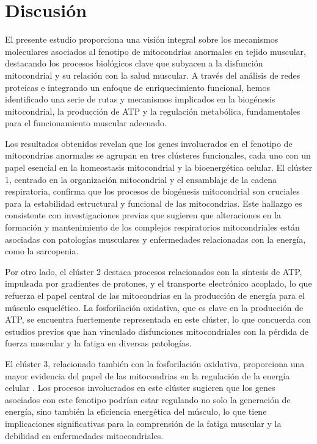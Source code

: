 \section{Discusión}

El presente estudio proporciona una visión integral sobre los mecanismos moleculares asociados al fenotipo de mitocondrias anormales en tejido muscular, destacando los procesos biológicos clave que subyacen a la disfunción mitocondrial y su relación con la salud muscular. A través del análisis de redes proteicas e integrando un enfoque de enriquecimiento funcional, hemos identificado una serie de rutas y mecanismos implicados en la biogénesis mitocondrial, la producción de ATP y la regulación metabólica, fundamentales para el funcionamiento muscular adecuado. \cite{Rebeca}

Los resultados obtenidos revelan que los genes involucrados en el fenotipo de mitocondrias anormales se agrupan en tres clústeres funcionales, cada uno con un papel esencial en la homeostasis mitocondrial y la bioenergética celular. El clúster 1, centrado en la organización mitocondrial y el ensamblaje de la cadena respiratoria, confirma que los procesos de biogénesis mitocondrial son cruciales para la estabilidad estructural y funcional de las mitocondrias. Este hallazgo es consistente con investigaciones previas que sugieren que alteraciones en la formación y mantenimiento de los complejos respiratorios mitocondriales están asociadas con patologías musculares y enfermedades relacionadas con la energía, como la sarcopenia. \cite{Milner}

Por otro lado, el clúster 2 destaca procesos relacionados con la síntesis de ATP, impulsada por gradientes de protones, y el transporte electrónico acoplado, lo que refuerza el papel central de las mitocondrias en la producción de energía para el músculo esquelético. La fosforilación oxidativa, que es clave en la producción de ATP, se encuentra fuertemente representada en este clúster, lo que concuerda con estudios previos que han vinculado disfunciones mitocondriales con la pérdida de fuerza muscular y la fatiga en diversas patologías.

El clúster 3, relacionado también con la fosforilación oxidativa, proporciona una mayor evidencia del papel de las mitocondrias en la regulación de la energía celular \cite{Zhao2011} . Los procesos involucrados en este clúster sugieren que los genes asociados con este fenotipo podrían estar regulando no solo la generación de energía, sino también la eficiencia energética del músculo, lo que tiene implicaciones significativas para la comprensión de la fatiga muscular y la debilidad en enfermedades mitocondriales.

